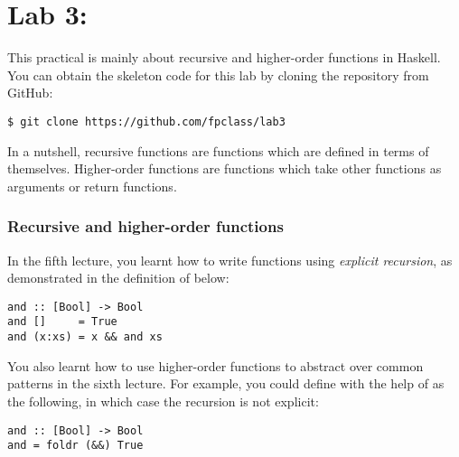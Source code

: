\section{Lab 3: \practicalThreeTitle}

This practical is mainly about recursive and higher-order functions in Haskell. You can obtain the skeleton code for this lab by cloning the repository from GitHub:
\begin{verbatim}
$ git clone https://github.com/fpclass/lab3
\end{verbatim}
In a nutshell, recursive functions are functions which are defined in terms of themselves. Higher-order functions are functions which take other functions as arguments or return functions.

\taskLine


\taskLine

\subsubsection{Recursive and higher-order functions}

In the fifth lecture, you learnt how to write functions using \emph{explicit recursion}, as demonstrated in the definition of  below:
\begin{verbatim}
and :: [Bool] -> Bool
and []     = True 
and (x:xs) = x && and xs
\end{verbatim}
You also learnt how to use higher-order functions to abstract over common patterns in the sixth lecture. For example, you could define  with the help of  as the following, in which case the recursion is not explicit:
\begin{verbatim}
and :: [Bool] -> Bool 
and = foldr (&&) True
\end{verbatim} 

